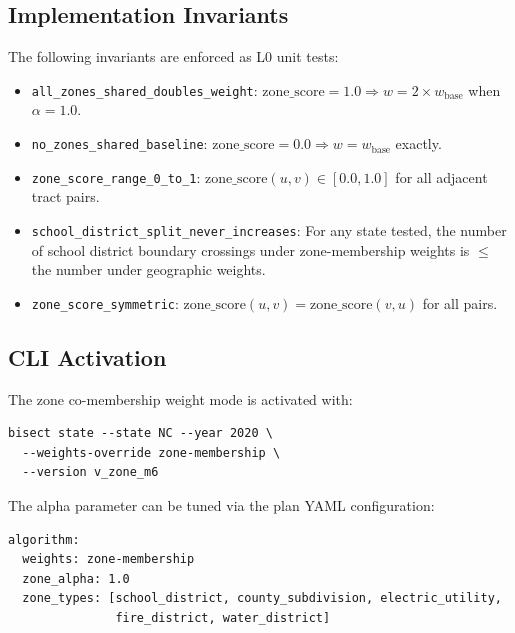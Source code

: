\subsection{Implementation Invariants}

The following invariants are enforced as L0 unit tests:
\begin{itemize}
  \item \texttt{all\_zones\_shared\_doubles\_weight}:
    $\mathrm{zone\_score} = 1.0 \Rightarrow w = 2 \times w_{\mathrm{base}}$ when $\alpha = 1.0$.
  \item \texttt{no\_zones\_shared\_baseline}:
    $\mathrm{zone\_score} = 0.0 \Rightarrow w = w_{\mathrm{base}}$ exactly.
  \item \texttt{zone\_score\_range\_0\_to\_1}:
    $\mathrm{zone\_score}(u,v) \in [0.0, 1.0]$ for all adjacent tract pairs.
  \item \texttt{school\_district\_split\_never\_increases}:
    For any state tested, the number of school district boundary crossings under
    zone-membership weights is $\leq$ the number under geographic weights.
  \item \texttt{zone\_score\_symmetric}:
    $\mathrm{zone\_score}(u,v) = \mathrm{zone\_score}(v,u)$ for all pairs.
\end{itemize}

\subsection{CLI Activation}

The zone co-membership weight mode is activated with:
\begin{verbatim}
bisect state --state NC --year 2020 \
  --weights-override zone-membership \
  --version v_zone_m6
\end{verbatim}
The alpha parameter can be tuned via the plan YAML configuration:
\begin{verbatim}
algorithm:
  weights: zone-membership
  zone_alpha: 1.0
  zone_types: [school_district, county_subdivision, electric_utility,
               fire_district, water_district]
\end{verbatim}
